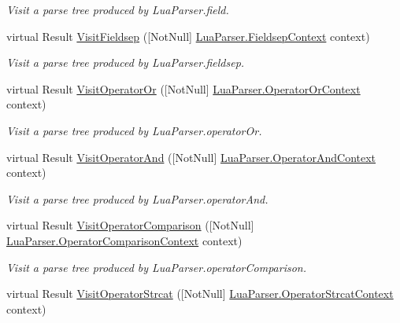 \begin{DoxyCompactItemize}
\begin{DoxyCompactList}\small\item\em Visit a parse tree produced by Lua\+Parser.\+field. \end{DoxyCompactList}\item 
virtual Result \mbox{\hyperlink{classzlua_1_1_lua_base_visitor_a98d3de2d27762c55d96d41ddac2f8b38}{Visit\+Fieldsep}} (\mbox{[}Not\+Null\mbox{]} \mbox{\hyperlink{classzlua_1_1_lua_parser_1_1_fieldsep_context}{Lua\+Parser.\+Fieldsep\+Context}} context)
\begin{DoxyCompactList}\small\item\em Visit a parse tree produced by Lua\+Parser.\+fieldsep. \end{DoxyCompactList}\item 
virtual Result \mbox{\hyperlink{classzlua_1_1_lua_base_visitor_a1ab126271c0f9f8a86946bb1f38942ee}{Visit\+Operator\+Or}} (\mbox{[}Not\+Null\mbox{]} \mbox{\hyperlink{classzlua_1_1_lua_parser_1_1_operator_or_context}{Lua\+Parser.\+Operator\+Or\+Context}} context)
\begin{DoxyCompactList}\small\item\em Visit a parse tree produced by Lua\+Parser.\+operator\+Or. \end{DoxyCompactList}\item 
virtual Result \mbox{\hyperlink{classzlua_1_1_lua_base_visitor_ae38f8049b6998fcbc7cd6374bfe1538a}{Visit\+Operator\+And}} (\mbox{[}Not\+Null\mbox{]} \mbox{\hyperlink{classzlua_1_1_lua_parser_1_1_operator_and_context}{Lua\+Parser.\+Operator\+And\+Context}} context)
\begin{DoxyCompactList}\small\item\em Visit a parse tree produced by Lua\+Parser.\+operator\+And. \end{DoxyCompactList}\item 
virtual Result \mbox{\hyperlink{classzlua_1_1_lua_base_visitor_a5339d6c6be6a7f222663c1cb2035925e}{Visit\+Operator\+Comparison}} (\mbox{[}Not\+Null\mbox{]} \mbox{\hyperlink{classzlua_1_1_lua_parser_1_1_operator_comparison_context}{Lua\+Parser.\+Operator\+Comparison\+Context}} context)
\begin{DoxyCompactList}\small\item\em Visit a parse tree produced by Lua\+Parser.\+operator\+Comparison. \end{DoxyCompactList}\item 
virtual Result \mbox{\hyperlink{classzlua_1_1_lua_base_visitor_a1a5bcdac1187b46cbb8d731919052d09}{Visit\+Operator\+Strcat}} (\mbox{[}Not\+Null\mbox{]} \mbox{\hyperlink{classzlua_1_1_lua_parser_1_1_operator_strcat_context}{Lua\+Parser.\+Operator\+Strcat\+Context}} context)

\end{DoxyCompactItemize}
